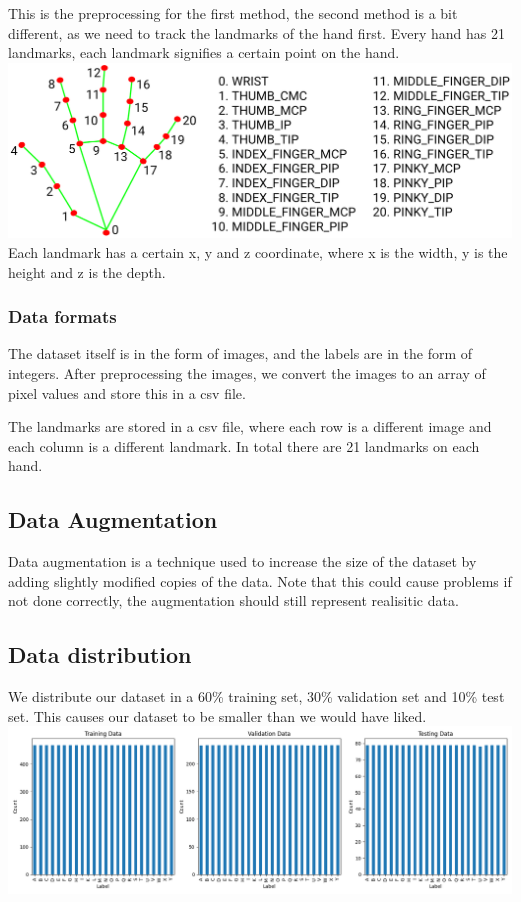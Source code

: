 \documentclass[../paper.tex]{subfiles}
\begin{document}
    This is the preprocessing for the first method, the second method is a bit different, as we need to track the landmarks of the hand first.
    Every hand has 21 landmarks, each landmark signifies a certain point on the hand.
    \includegraphics[width=\linewidth]{hand_landmarks}
    Each landmark has a certain x, y and z coordinate, where x is the width, y is the height and z is the depth.

    \subsubsection{Data formats}
    The dataset itself is in the form of images, and the labels are in the form of integers. 
    After preprocessing the images, we convert the images to an array of pixel values and store this in a csv file. 

    The landmarks are stored in a csv file, where each row is a different image and each column is a different landmark.
    In total there are 21 landmarks on each hand.

    \subsection{Data Augmentation}
    Data augmentation is a technique used to increase the size of the dataset by adding slightly modified copies of the data.
    Note that this could cause problems if not done correctly, the augmentation should still represent realisitic data.

    \subsection{Data distribution}
    We distribute our dataset in a 60\% training set, 30\% validation set and 10\% test set.
    This causes our dataset to be smaller than we would have liked.
    \includegraphics[width=\linewidth]{dataset_distribution}

    
\end{document}

